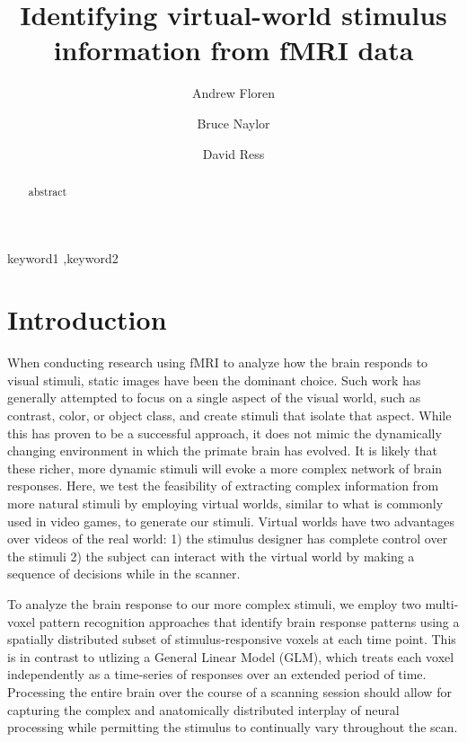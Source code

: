 \documentclass[preprint,5p,authoryear]{elsarticle}
\begin{document}
\begin{frontmatter}

\title{Identifying virtual-world stimulus information from fMRI data}

\author[UT]{Andrew Floren}

\author[UT]{Bruce Naylor}

\author[UT]{David Ress}

\address[UT]{The University of Texas at Austin, Austin, TX 78712 USA}


\begin{abstract}
abstract
\end{abstract}

\begin{keyword}
keyword1 \sep keyword2
\end{keyword}

\end{frontmatter}

\section{Introduction}
When conducting research using fMRI to analyze how the brain responds to visual stimuli, static images have been  the dominant choice.
Such work has generally attempted to focus on a single aspect of the visual world, such as contrast, color, or object class, and create stimuli that isolate that aspect.
While this has proven to be a successful approach, it does not mimic the dynamically changing environment in which the primate brain has evolved.
It is likely that these richer, more dynamic stimuli will evoke a more complex network of brain responses.
Here, we test the feasibility of extracting complex information from more natural stimuli by employing virtual worlds, similar to what is commonly used in video games, to generate our  stimuli.
Virtual worlds have two advantages over videos of the real world: 1) the stimulus designer has complete control over the stimuli 2) the subject can interact with the virtual world by making a sequence of decisions while in the scanner.

To analyze the brain response to our more complex stimuli, we employ two multi-voxel pattern recognition approaches that identify brain response patterns using a spatially distributed subset of stimulus-responsive voxels at each time point.
This is in contrast to utlizing a General Linear Model (GLM), which treats each voxel independently as a time-series of responses over an extended period of time.
Processing the entire brain over the course of a scanning session should allow for capturing the complex and anatomically distributed interplay of neural processing while permitting the stimulus to continually vary throughout the scan.
\end{document}
